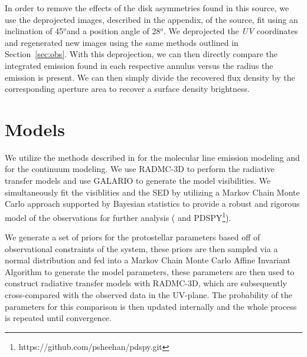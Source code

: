 \documentclass[preprint,12pt]{aastex62}
\renewcommand{\deg}{$^{o}$}
\begin{document}
In order to remove the effects of the disk asymmetries found in this source, we use the deprojected images, described in the appendix, of the source, fit using an inclination of 45\deg\space and a position angle of 28\deg. We deprojected the \textit{UV} coordinates and regenerated new images using the same methods outlined in Section~\ref{sec:obs}. With this deprojection, we can then directly compare the integrated emission found in each respective annulus versus the radius the emission is present. We can then simply divide the recovered flux density by the corresponding aperture area to recover a surface density brightness.

\section{Models}\label{sec:modelresults}
We utilize the methods described in \citet{2017ApJ...846L..26W} for the molecular line emission modeling and \citet{2017ApJ...851...45S} for the continuum modeling. We use RADMC-3D \citep{2012ascl.soft02015D} to perform the radiative transfer models and use GALARIO \citep{2018MNRAS.476.4527T} to generate the model visibilities. We simultaneously fit the visiblities and the SED by utilizing a Markov Chain Monte Carlo approach supported by Bayesian statistics to provide a robust and rigorous model of the observations for further analysis (\cite[emcee]{2013PASP..125..306F} and PDSPY\footnote{https://github.com/psheehan/pdspy.git}).

We generate a set of priors for the protostellar parameters based off of observational constraints of the system, these priors are then sampled via a normal distribution and fed into a Markov Chain Monte Carlo Affine Invariant Algorithm \citep[emcee]{2013PASP..125..306F} to generate the model parameters, these parameters are then used to construct radiative transfer models with RADMC-3D, which are subsequently cross-compared with the observed data in the UV-plane. The probability of the parameters for this comparison is then updated internally and the whole process is repeated until convergence.
\end{document}
